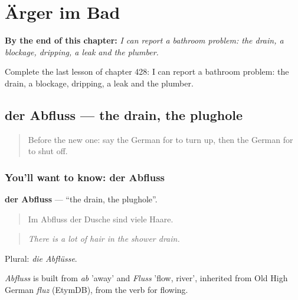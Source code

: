 
\chapter{Ärger im Bad}
\label{ch:ge-arger-im-bad}

\begin{chapteropening}
\textbf{By the end of this chapter:} \emph{I can report a bathroom problem: the drain, a blockage, dripping, a leak and the plumber.}

Complete the last lesson of chapter 428: I can report a bathroom problem: the drain, a blockage, dripping, a leak and the plumber.
\end{chapteropening}

\section[der Abfluss]{der Abfluss — the drain, the plughole}

\label{lesson:GE-C428-abfluss}



\begin{quote}
Before the new one: say the German for to turn up, then the German for to shut off.
\end{quote}

\subsection*{You'll want to know: der Abfluss}
\textbf{der Abfluss} — \textquotedblleft{}the drain, the plughole\textquotedblright{}.

\begin{quote}
Im Abfluss der Dusche sind viele Haare.
\end{quote}

\begin{quote}
\emph{There is a lot of hair in the shower drain.}
\end{quote}

Plural: \emph{die Abflüsse}.

\begin{cousinweb}
\emph{Abfluss} is built from \emph{ab} 'away' and \emph{Fluss} 'flow, river', inherited from Old High German \emph{fluz} (EtymDB), from the verb for flowing.
\end{cousinweb}

